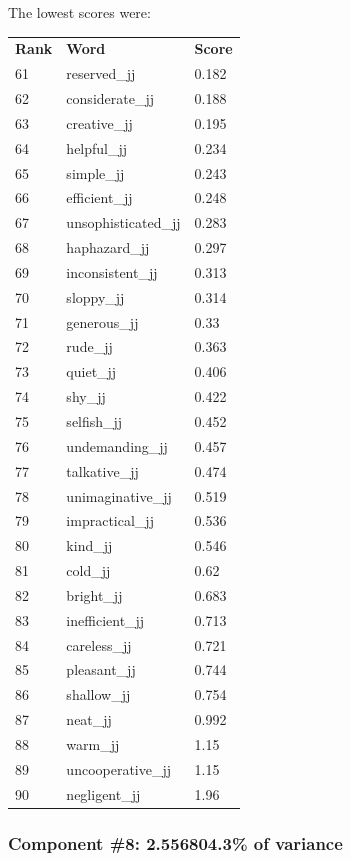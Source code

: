 \documentclass[10pt,letterpaper]{book}
\begin{document}
The lowest scores were:
\begin{tabular}{ l l l }
        \textbf{Rank} & \textbf{Word} & \textbf{Score} \\
        61 & reserved\_jj & 0.182 \\
        62 & considerate\_jj & 0.188 \\
        63 & creative\_jj & 0.195 \\
        64 & helpful\_jj & 0.234 \\
        65 & simple\_jj & 0.243 \\
        66 & efficient\_jj & 0.248 \\
        67 & unsophisticated\_jj & 0.283 \\
        68 & haphazard\_jj & 0.297 \\
        69 & inconsistent\_jj & 0.313 \\
        70 & sloppy\_jj & 0.314 \\
        71 & generous\_jj & 0.33 \\
        72 & rude\_jj & 0.363 \\
        73 & quiet\_jj & 0.406 \\
        74 & shy\_jj & 0.422 \\
        75 & selfish\_jj & 0.452 \\
        76 & undemanding\_jj & 0.457 \\
        77 & talkative\_jj & 0.474 \\
        78 & unimaginative\_jj & 0.519 \\
        79 & impractical\_jj & 0.536 \\
        80 & kind\_jj & 0.546 \\
        81 & cold\_jj & 0.62 \\
        82 & bright\_jj & 0.683 \\
        83 & inefficient\_jj & 0.713 \\
        84 & careless\_jj & 0.721 \\
        85 & pleasant\_jj & 0.744 \\
        86 & shallow\_jj & 0.754 \\
        87 & neat\_jj & 0.992 \\
        88 & warm\_jj & 1.15 \\
        89 & uncooperative\_jj & 1.15 \\
        90 & negligent\_jj & 1.96 \\
\end{tabular}
\subsubsection{Component \#8: 2.556804.3\% of variance}
\end{document}
